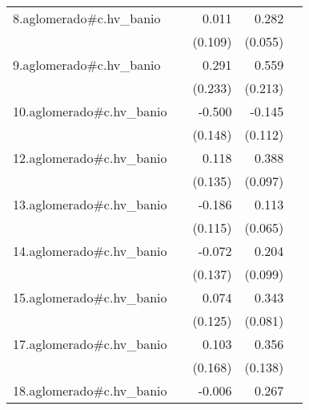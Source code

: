 {\begin{longtable}{l*{4}{D{.}{.}{-1}}}
\addlinespace
8.aglomerado#c.hv\_banio&                     &       0.011         &       0.282\sym{***}&                     \\
            &                     &     (0.109)         &     (0.055)         &                     \\
\addlinespace
9.aglomerado#c.hv\_banio&                     &       0.291         &       0.559\sym{**} &                     \\
            &                     &     (0.233)         &     (0.213)         &                     \\
\addlinespace
10.aglomerado#c.hv\_banio&                     &      -0.500\sym{***}&      -0.145         &                     \\
            &                     &     (0.148)         &     (0.112)         &                     \\
\addlinespace
12.aglomerado#c.hv\_banio&                     &       0.118         &       0.388\sym{***}&                     \\
            &                     &     (0.135)         &     (0.097)         &                     \\
\addlinespace
13.aglomerado#c.hv\_banio&                     &      -0.186         &       0.113         &                     \\
            &                     &     (0.115)         &     (0.065)         &                     \\
\addlinespace
14.aglomerado#c.hv\_banio&                     &      -0.072         &       0.204\sym{*}  &                     \\
            &                     &     (0.137)         &     (0.099)         &                     \\
\addlinespace
15.aglomerado#c.hv\_banio&                     &       0.074         &       0.343\sym{***}&                     \\
            &                     &     (0.125)         &     (0.081)         &                     \\
\addlinespace
17.aglomerado#c.hv\_banio&                     &       0.103         &       0.356\sym{*}  &                     \\
            &                     &     (0.168)         &     (0.138)         &                     \\
\addlinespace
18.aglomerado#c.hv\_banio&                     &      -0.006         &       0.267\sym{***}&                     \\

\end{longtable}}

